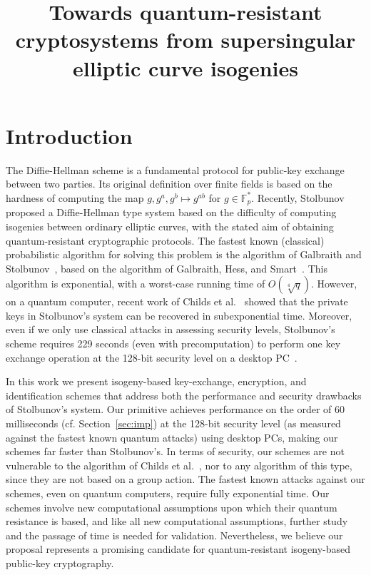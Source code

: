 \documentclass[jmc]{degruyter-journal-a}
\title{Towards quantum-resistant cryptosystems from supersingular elliptic
curve isogenies}
\theoremstyle{definition}
\newcommand{\FF}{{\mathbb{F}}}
\begin{document}
\section{Introduction}

The Diffie-Hellman scheme is a fundamental protocol for public-key
exchange between two parties. Its original definition over finite
fields is based on the hardness of computing the map $g,g^a,g^b
\mapsto g^{ab}$ for $g \in \FF_p^*$. Recently, Stolbunov~\cite{Stol}
proposed a Diffie-Hellman type system based on the difficulty of
computing isogenies between ordinary elliptic curves, with the stated
aim of obtaining quantum-resistant cryptographic protocols.  The
fastest known (classical) probabilistic algorithm for solving this
problem is the algorithm of Galbraith and Stolbunov~\cite{gs}, based
on the algorithm of Galbraith, Hess, and Smart~\cite{GHS}. This
algorithm is exponential, with a worst-case running time of
$O(\sqrt[4]{q})$. However, on a quantum computer, recent work of
Childs et al.~\cite{CJS} showed that the private keys in
Stolbunov's system can be recovered in subexponential time. Moreover,
even if we only use classical attacks in assessing security levels,
Stolbunov's scheme requires 229 seconds (even with precomputation) to
perform one key exchange operation at the 128-bit security level on a
desktop PC~\cite[Table 1]{Stol}.

In this work we present isogeny-based key-exchange, encryption, and
identification schemes that address both the performance and security
drawbacks of Stolbunov's system. Our primitive achieves performance on
the order of 60 milliseconds (cf. Section~\ref{sec:imp}) at the
128-bit security level (as measured against the fastest known quantum
attacks) using desktop PCs, making our schemes far faster than
Stolbunov's. In terms of security, our schemes are not vulnerable to
the algorithm of Childs et al.~\cite{CJS}, nor to any algorithm of
this type, since they are not based on a group action. The fastest
known attacks against our schemes, even on quantum computers, require
fully exponential time. Our schemes involve new computational
assumptions upon which their quantum resistance is based, and like all
new computational assumptions, further study and the passage of time
is needed for validation. Nevertheless, we believe our proposal
represents a promising candidate for quantum-resistant isogeny-based
public-key cryptography.
\end{document}
